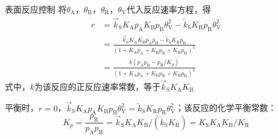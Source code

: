 \begin{frame}{表面反应控制}
    将$\theta_\mathrm{A}$，$\theta_\mathrm{B}$，$\theta_\mathrm{R}$，$\theta_\mathrm{V}$代入反应速率方程，得
    \[
        \begin{aligned}
            r&=\overrightarrow{k}_\mathrm{S}K_\mathrm{A}p_\mathrm{A}K_\mathrm{B}p_\mathrm{B}\theta_\mathrm{V}^2-\overleftarrow{k}_\mathrm{S}K_\mathrm{R}p_\mathrm{R}\theta_\mathrm{V}^2 \\
            &=\frac{\vec{k}_{\mathrm{S}} K_{\mathrm{A}} K_{\mathrm{B}} p_{\mathrm{A}} p_{\mathrm{B}}-\overleftarrow{k}_{\mathrm{S}} K_{\mathrm{R}} p_{\mathrm{R}}}{(1+K_{\mathrm{A}} p_{\mathrm{A}}+K_{\mathrm{B}} p_{\mathrm{B}}+K_{\mathrm{R}} p_{\mathrm{R}})^{2}} \\
            &=\frac{k(p_{\mathrm{A}} p_{\mathrm{B}}-p_{\mathrm{R}} / K_p)}{(1+K_{\mathrm{A}} p_{\mathrm{A}}+K_{\mathrm{B}} p_{\mathrm{B}}+K_{\mathrm{R}} p_{\mathrm{R}})^{2}}
        \end{aligned}
    \]
    式中，$k$为该反应的正反应速率常数，等于$\vec{k}_{\mathrm{S}} K_{\mathrm{A}} K_{\mathrm{B}}$
    \begin{block}{}
        平衡时，$r = 0$，$\overrightarrow{k}_\mathrm{S}K_\mathrm{A}p_\mathrm{A}K_\mathrm{B}p_\mathrm{B}\theta_\mathrm{V}^2 = \overleftarrow{k}_\mathrm{S}K_\mathrm{R}p_\mathrm{R}\theta_\mathrm{V}^2$；该反应的化学平衡常数：
        \[
            K_p = \frac{p_\mathrm{R}}{p_\mathrm{A}p_\mathrm{B}} = \vec{k}_{\mathrm{S}} K_{\mathrm{A}} K_{\mathrm{B}}/(\overleftarrow{k}_\mathrm{S}K_\mathrm{R}) = {K}_{\mathrm{S}} K_{\mathrm{A}} K_{\mathrm{B}}/K_\mathrm{R}
        \]
    \end{block}
\end{frame}


